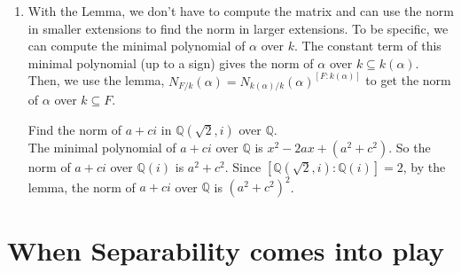 \documentclass[15pt]{scrartcl}
\newcommand{\Q}{\mathbb{Q}}
\begin{document}
\begin{enumerate}
\begin{example}
Well the answer is YES. 
    \end{example}
\begin{lemma}
    If $k\subseteq k(\alpha) \subseteq F$ are finite extensions, and $[F:k(\alpha)]=r$, then for any $\beta \in k(\alpha)$, we have
    \[
    N_{F/k}(\beta) = N_{k(\alpha)/k}(\beta)^r.
    \]
\end{lemma}
The key of the proof is to write down a basis of $F$ over $k$ using a basis of $k(\alpha)$ over $k$ and a basis of $F$ over $k(\alpha)$.
    \item With the Lemma, we don't have to compute the matrix and can use the norm in smaller extensions to find the norm in larger extensions. To be specific, we can compute the minimal polynomial of $\alpha$ over $k$. The constant term of this minimal polynomial (up to a sign) gives the norm of $\alpha$ over $k\subseteq k(\alpha)$.
    \\

    Then, we use the lemma, $N_{F/k}(\alpha) = N_{k(\alpha)/k}(\alpha)^{[F:k(\alpha)]}$ to get the norm of $\alpha$ over $k\subseteq F$.
    \begin{example}
        Find the norm of $a+ci$ in $\Q(\sqrt{2},i)$ over $\Q$.
        \\

        The minimal polynomial of $a+ci$ over $\Q$ is $x^2-2ax+(a^2+c^2)$. So the norm of $a+ci$ over $\Q(i)$ is $a^2+c^2$. Since $[\Q(\sqrt{2},i):\Q(i)]=2$, by the lemma, the norm of $a+ci$ over $\Q$ is $(a^2+c^2)^2$.
    \end{example}
\end{enumerate}
\section{When Separability comes into play}
\end{document}
